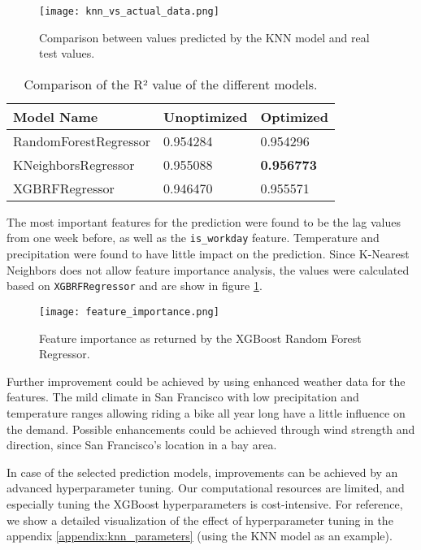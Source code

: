 \begin{figure}[hbtp]
    \texttt{[image: knn\_vs\_actual\_data.png]}
    \caption{Comparison between values predicted by the KNN model and real test values.}
\end{figure}

\begin{table}[!ht]
    \centering
    \begin{tabular}{|l|l|l|}
    \hline
        \textbf{Model Name} & \textbf{Unoptimized} & \textbf{Optimized} \\ \hline
        RandomForestRegressor & 0.954284 & 0.954296 \\ \hline
        KNeighborsRegressor & 0.955088 & \textbf{0.956773} \\ \hline
        XGBRFRegressor & 0.946470 & 0.955571 \\ \hline
    \end{tabular}
    \caption{Comparison of the R² value of the different models.}
\end{table}

The most important features for the prediction were found to be the lag values from one week before, as well as the \texttt{is\_workday} feature. Temperature and precipitation were found to have little impact on the prediction. Since K-Nearest Neighbors does not allow feature importance analysis, the values were calculated based on \texttt{XGBRFRegressor} and are show in figure \ref{fig:feature_importance}.

\begin{figure}[hbtp]
    \centering
    \texttt{[image: feature\_importance.png]}
    \caption{Feature importance as returned by the XGBoost Random Forest Regressor.}
    \label{fig:feature_importance}
\end{figure}

Further improvement could be achieved by using enhanced weather data for the features. The mild climate in San Francisco with low precipitation and temperature ranges allowing riding a bike all year long have a little influence on the demand. Possible enhancements could be achieved through wind strength and direction, since San Francisco's location in a bay area.
 
In case of the selected prediction models, improvements can be achieved by an advanced hyperparameter tuning. Our computational resources are limited, and especially tuning the XGBoost hyperparameters is cost-intensive. For reference, we show a detailed visualization of the effect of hyperparameter tuning  in the appendix \ref{appendix:knn_parameters} (using the KNN model as an example).

